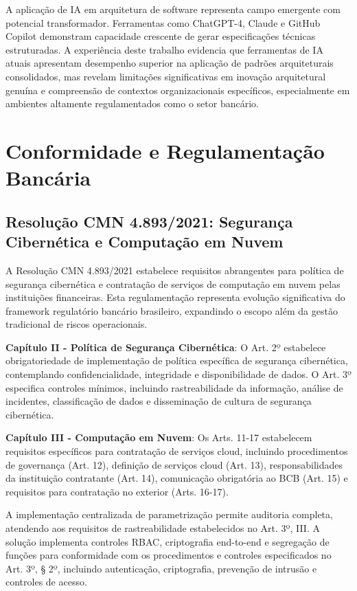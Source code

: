 A aplicação de IA em arquitetura de software representa campo emergente com potencial transformador. Ferramentas como ChatGPT-4, Claude e GitHub Copilot demonstram capacidade crescente de gerar especificações técnicas estruturadas. A experiência deste trabalho evidencia que ferramentas de IA atuais apresentam desempenho superior na aplicação de padrões arquiteturais consolidados, mas revelam limitações significativas em inovação arquitetural genuína e compreensão de contextos organizacionais específicos, especialmente em ambientes altamente regulamentados como o setor bancário.

\section{Conformidade e Regulamentação Bancária}

\subsection{Resolução CMN 4.893/2021: Segurança Cibernética e Computação em Nuvem}

A Resolução CMN 4.893/2021 estabelece requisitos abrangentes para política de segurança cibernética e contratação de serviços de computação em nuvem pelas instituições financeiras. Esta regulamentação representa evolução significativa do framework regulatório bancário brasileiro, expandindo o escopo além da gestão tradicional de riscos operacionais.

\textbf{Capítulo II - Política de Segurança Cibernética}: O Art. 2º estabelece obrigatoriedade de implementação de política específica de segurança cibernética, contemplando confidencialidade, integridade e disponibilidade de dados. O Art. 3º especifica controles mínimos, incluindo rastreabilidade da informação, análise de incidentes, classificação de dados e disseminação de cultura de segurança cibernética.

\textbf{Capítulo III - Computação em Nuvem}: Os Arts. 11-17 estabelecem requisitos específicos para contratação de serviços cloud, incluindo procedimentos de governança (Art. 12), definição de serviços cloud (Art. 13), responsabilidades da instituição contratante (Art. 14), comunicação obrigatória ao BCB (Art. 15) e requisitos para contratação no exterior (Arts. 16-17).

A implementação centralizada de parametrização permite auditoria completa, atendendo aos requisitos de rastreabilidade estabelecidos no Art. 3º, III. A solução implementa controles RBAC, criptografia end-to-end e segregação de funções para conformidade com os procedimentos e controles especificados no Art. 3º, § 2º, incluindo autenticação, criptografia, prevenção de intrusão e controles de acesso.

